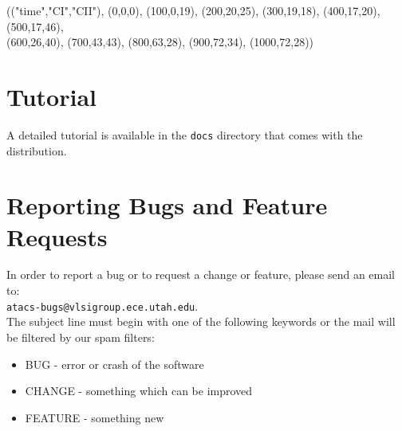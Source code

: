 \documentclass[titlepage,11pt]{article}
\begin{document}
(("time","CI","CII"), (0,0,0), (100,0,19), (200,20,25), (300,19,18), (400,17,20), (500,17,46), \\
(600,26,40), (700,43,43), (800,63,28), (900,72,34), (1000,72,28))

\section{Tutorial}

\noindent
A detailed 
tutorial
is available in the {\tt docs} directory that comes with the distribution.

\section{Reporting Bugs and Feature Requests}

\noindent
In order to report a bug or to request a change or feature, please
send an email to:\\ 
{\tt atacs-bugs@vlsigroup.ece.utah.edu}.\\
The subject line must begin with one of the following keywords or the
mail will be filtered by our spam filters:
\begin{itemize}
\item BUG - error or crash of the software
\item CHANGE - something which can be improved
\item FEATURE - something new
\end{itemize}
 
\end{document}
